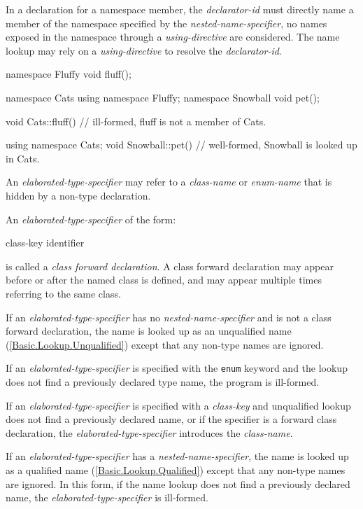 \p In a declaration for a namespace member, the \textit{declarator-id} must
directly name a member of the namespace specified by the
\textit{nested-name-specifier}, no names exposed in the namespace through a
\textit{using-directive} are considered. The name lookup may rely on a
\textit{using-directive} to resolve the \textit{declarator-id}.

\begin{HLSL}
namespace Fluffy {
  void fluff();
}

namespace Cats {
  using namespace Fluffy;
  namespace Snowball {
    void pet();
  }
}

void Cats::fluff() {} // ill-formed, fluff is not a member of Cats.

using namespace Cats;
void Snowball::pet() {} // well-formed, Snowball is looked up in Cats.
\end{HLSL}


\p An \textit{elaborated-type-specifier} may refer to a \textit{class-name} or
\textit{enum-name} that is hidden by a non-type declaration.

\p An \textit{elaborated-type-specifier} of the form:
\begin{innergrammar}
class-key  identifier \terminal{;}
\end{innergrammar}
is called a \textit{class forward declaration}. A class forward declaration may
appear before or after the named class is defined, and may appear multiple times
referring to the same class.

\p If an \textit{elaborated-type-specifier} has no
\textit{nested-name-specifier} and is not a class forward declaration, the name
is looked up as an unqualified name (\ref{Basic.Lookup.Unqualified}) except that
any non-type names are ignored.

\p If an \textit{elaborated-type-specifier} is specified with the \texttt{enum}
keyword and the lookup does not find a previously declared type name, the
program is ill-formed.

\p If an \textit{elaborated-type-specifier} is specified with a
\textit{class-key} and unqualified lookup does not find a previously declared
name, or if the specifier is a forward class declaration, the
\textit{elaborated-type-specifier} introduces the \textit{class-name}.

\p If an \textit{elaborated-type-specifier} has a
\textit{nested-name-specifier}, the name is looked up as a qualified name
(\ref{Basic.Lookup.Qualified}) except that any non-type names are ignored. In
this form, if the name lookup does not find a previously declared name, the
\textit{elaborated-type-specifier} is ill-formed.

